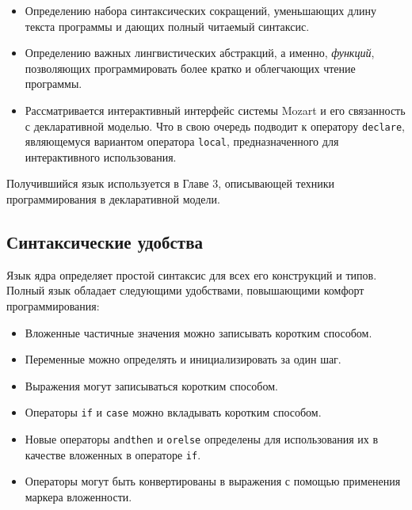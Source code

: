 \begin{itemize}
\item{Определению набора синтаксических сокращений, уменьшающих длину текста программы и дающих полный читаемый синтаксис.}

\item{Определению важных лингвистических абстракций, а именно, \emph{функций}, позволяющих программировать более кратко и облегчающих чтение программы.}

\item{Рассматривается интерактивный интерфейс системы Mozart и его связанность с декларативной моделью. Что в свою очередь подводит к оператору \lstinline|declare|, являющемуся вариантом оператора \lstinline|local|, предназначенного для интерактивного использования.}
\end{itemize}

Получившийся язык используется в Главе 3, описывающей техники программирования в декларативной модели.

\subsection{Синтаксические удобства}\label{subsection:syntactic_conveniences}

Язык ядра определяет простой синтаксис для всех его конструкций и типов. Полный язык обладает следующими удобствами, повышающими комфорт программирования:

\begin{itemize}
\item{Вложенные частичные значения можно записывать коротким способом.}

\item{Переменные можно определять и инициализировать за один шаг.}

\item{Выражения могут записываться коротким способом.}

\item{Операторы \lstinline|if| и \lstinline|case| можно вкладывать коротким способом.}

\item{Новые операторы \lstinline|andthen| и \lstinline|orelse| определены для использования их в качестве вложенных в операторе \lstinline|if|.}

\item{Операторы могут быть конвертированы в выражения с помощью применения маркера вложенности.}
\end{itemize}

